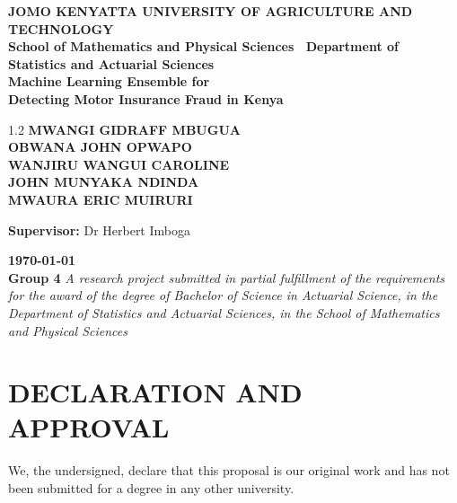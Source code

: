 \documentclass[12pt,a4paper,oneside]{report}
\numberwithin{equation}{chapter}
\begin{document}
\thispagestyle{empty}
\begin{titlepage}
\NoBgThispage
\begin{center}
    \vspace*{0.5cm}
    {\Large \textbf{JOMO KENYATTA UNIVERSITY OF AGRICULTURE AND TECHNOLOGY}} \\
    {\small \textbf{School of Mathematics and Physical Sciences \textbullet\ Department of Statistics and Actuarial Sciences}} \\
    \vspace{2cm}
    {\Huge \textbf{Machine Learning Ensemble for}} \\
    {\Huge \textbf{Detecting Motor Insurance Fraud in Kenya}} \\
    \vspace{2cm}
    \begin{spacing}{1.2}
        \textbf{MWANGI GIDRAFF MBUGUA}    \\
        \textbf{OBWANA JOHN OPWAPO}        \\
        \textbf{WANJIRU WANGUI CAROLINE}   \\
        \textbf{JOHN MUNYAKA NDINDA}       \\
        \textbf{MWAURA ERIC MUIRURI}       \\
    \end{spacing}
    \vspace{1.5cm}
    \textbf{Supervisor:} \quad Dr Herbert Imboga
    \vspace{1cm}

    \textbf{\today} \\
    \vspace{1cm}
    \textbf{Group 4}
    \vfill
    \footnotesize
    \textit{A research project submitted in partial fulfillment of the requirements for the award
    of the degree of Bachelor of Science in Actuarial Science, in the Department of Statistics
    and Actuarial Sciences, in the School of Mathematics and Physical Sciences}
\end{center}
\end{titlepage}

\newpage
{}
\section*{DECLARATION AND APPROVAL}

\noindent We, the undersigned, declare that this proposal is our original work and has not been
submitted for a degree in any other university.
\end{document}
